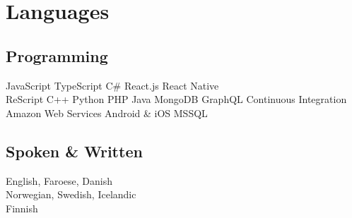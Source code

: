 \documentclass[]{deedy-resume-openfont}
\begin{document}
\section{Languages}
\begin{minipage}[t]{.6\textwidth}
\subsection{Programming}
JavaScript \textbullet{} TypeScript \textbullet{} C\# \textbullet{} React.js \textbullet{} React Native \\
ReScript \textbullet{} C++ \textbullet{} Python \textbullet{} PHP \textbullet{} Java \textbullet{} MongoDB \textbullet{} GraphQL \textbullet{} Continuous Integration \\
Amazon Web Services \textbullet{} Android \& iOS \textbullet{} MSSQL
\sectionsep
\end{minipage}
\hfill
\begin{minipage}[t]{.35\textwidth}
\subsection{Spoken \& Written}
 English, Faroese, Danish\\
 Norwegian, Swedish, Icelandic\\
 Finnish\\
\end{minipage}
\end{document}
